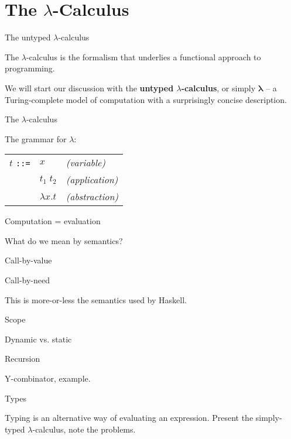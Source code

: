 
\section{The $\lambda$-Calculus}

%
\begin{frame}{The untyped $\lambda$-calculus}

The $\lambda$-calculus is the formalism that underlies a functional approach to
programming.

We will start our discussion with the \textbf{untyped $\lambda$-calculus}, or
simply $\mathbf{\lambda}$ -- a Turing-complete model of computation with a
surprisingly concise description.

\end{frame}

%
\begin{frame}{The $\lambda$-calculus}

The grammar for $\lambda$:

\begin{tabular}{lll}
  $t$ \texttt{::=} & $x$              & \emph{(variable)} \\
                   & $t_1 \; t_2$     & \emph{(application)} \\
                   & $\lambda x . t$  & \emph{(abstraction)} \\
\end{tabular}

\end{frame}

%
\begin{frame}{Computation = evaluation}

What do we mean by semantics?

\end{frame}

%
\begin{frame}{Call-by-value}



\end{frame}

%
\begin{frame}{Call-by-need}

This is more-or-less the semantics used by Haskell.

\end{frame}

%
\begin{frame}{Scope}

Dynamic vs. static

\end{frame}

%
\begin{frame}{Recursion}

Y-combinator, example.

\end{frame}

%
\begin{frame}{Types}

Typing is an alternative way of evaluating an expression. Present the
simply-typed $\lambda$-calculus, note the problems.

\end{frame}

